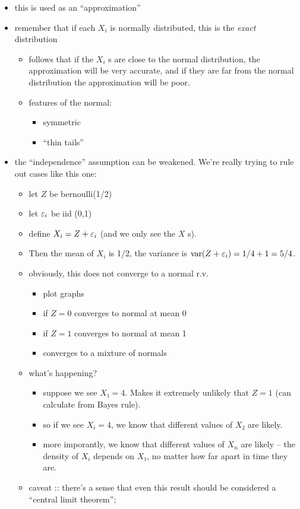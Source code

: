 \begin{itemize}
\item this is used as an ``approximation''
\item remember that if each $X_i$ is normally distributed, this is the
       \emph{exact} distribution
\begin{itemize}
\item follows that if the $X_i$ s are close to the normal
         distribution, the approximation will be very accurate, and if
         they are far from the normal distribution the approximation
         will be poor.
\item features of the normal:
\begin{itemize}
\item symmetric
\item ``thin tails''
\end{itemize}
\end{itemize}
\item the ``independence'' assumption can be weakened.  We're really
       trying to rule out cases like this one:
\begin{itemize}
\item let $Z$ be bernoulli(1/2)
\item let $\varepsilon_i$ be iid (0,1)
\item define $X_i = Z + \varepsilon_i$ (and we only see the $X$ s).
\item Then the mean of $X_i$ is 1/2, the variance is $\operatorname{var}(Z + \varepsilon_i)
  = 1/4 + 1 = 5/4$.
\item obviously, this does not converge to a normal r.v.
\begin{itemize}
\item plot graphs
\item if $Z = 0$ converges to normal at mean 0
\item if $Z = 1$ converges to normal at mean 1
\item converges to a mixture of normals
\end{itemize}
\item what's happening?
\begin{itemize}
\item suppose we see $X₁ = 4$.  Makes it extremely unlikely that
           $Z = 1$ (can calculate from Bayes rule).
\item so if we see $X_i = 4$, we know that different values of
           $X₂$ are likely.
\item more imporantly, we know that different values of $X_n$ are
           likely -- the density of $X_i$ depends on $X₁$, no matter
           how far apart in time they are.
\end{itemize}
\item caveat :: there's a sense that even this result should be
                   considered a ``central limit theorem'';
\end{itemize}
\end{itemize}

